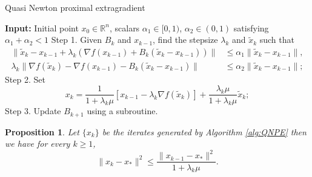 \documentclass[11pt]{article}
\newtheorem{proposition}{Proposition}
\newcommand{\R}{\mathbb{R}}
\newcommand{\tx}{\tilde x}
\begin{document}
\begin{algorithm}[H]
	\caption{Quasi Newton proximal extragradient}
	\begin{algorithmic} \label{alg:QNPE}
		\STATE \textbf{Input:} Initial point $x_0\in \R^n$, scalars $\alpha_1 \in[0, 1)$, $\alpha_2 \in (0,1)$ satisfying $\alpha_1+\alpha_2 <1$
		\STATE Step 1. Given $B_k$ and $x_{k-1}$, find the stepsize $\lambda_k$ and $\tx_k$ such that
		\begin{align}
			\|\tx_k - x_{k-1} + \lambda_k \left(\nabla f(x_{k-1}) + B_k(\tx_k - x_{k-1}) \right)\| &\le \alpha_1 \|\tx_k - x_{k-1}\|, \label{ineq:req1} \\
			\lambda_k \|\nabla f(\tx_k) - \nabla f(x_{k-1}) - B_k (\tx_k - x_{k-1})\| &\le \alpha_2 \|\tx_k - x_{k-1}\|; \label{ineq:req2}
		\end{align}
		\STATE Step 2. Set 
		\begin{equation}\label{eq:xk}
			x_k= \frac{1}{1+\lambda_k \mu} [x_{k-1} - \lambda_k \nabla f(\tx_k)] + \frac{\lambda_k \mu}{1+\lambda_k \mu} \tx_k;
		\end{equation}
		\STATE Step 3. Update $B_{k+1}$ using a subroutine.
		\ENDFOR
	\end{algorithmic}
\end{algorithm}


\begin{proposition}\label{prop}
	Let $\{x_k\}$ be the iterates generated by Algorithm \ref{alg:QNPE} then we have for every $k\ge 1$,
	\begin{equation}\label{ineq:goal1}
		\|x_k-x_*\|^2 \le  \frac{\|x_{k-1}-x_*\|^2}{1+\lambda_k \mu}.
	\end{equation}
\end{proposition}
\end{document}
